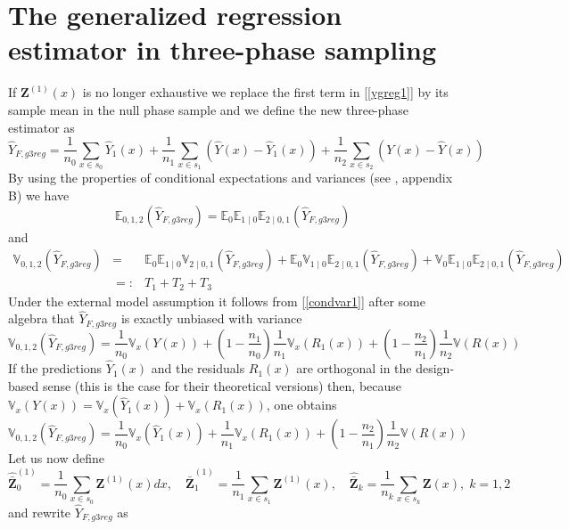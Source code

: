 \documentclass[a4paper,12pt,leqno, titlepage]{article}
\newcommand{\EX}{\mathbb{E}}
\newcommand{\VAR}{\mathbb{V}}
\begin{document}
\section{The generalized regression estimator in three-phase sampling}
If $\pmb{Z}^{(1)}(x)$ is no longer exhaustive we replace the first term in [\ref{ygreg1}] by its sample mean in the null phase sample and we define the new three-phase estimator as
\begin{equation}\label{y0greg1}
\hat{Y}_{F,g3reg} = \frac{1}{n_0} \sum_{x\in{s_0}} \hat{Y}_1(x)
+\frac{1}{n_1}\sum_{x\in{s}_1}(\hat{Y}(x)-\hat{Y}_1(x))
+ \frac{1}{n_2}\sum_{x\in{s}_2}(Y(x)-\hat{Y}(x))
\end{equation}
By using the properties of conditional expectations and variances (see \cite{mandallaz}, appendix B) we have
\begin{equation}\label{condexp1}
\EX_{0,1,2}(\hat{Y}_{F,g3reg})=\EX_0 \EX_{1 \mid 0}\EX_{2 \mid 0,1}(\hat{Y}_{F,g3reg})
\end{equation}
and
\begin{eqnarray}\label{condvar1}
\VAR_{0,1,2}(\hat{Y}_{F,g3reg})&=&\EX_0 \EX_{1 \mid 0}\VAR_{2 \mid 0,1}(\hat{Y}_{F,g3reg})+
\EX_0 \VAR_{1 \mid 0}\EX_{2 \mid 0,1}(\hat{Y}_{F,g3reg})
+\VAR_0 \EX_{1 \mid 0}\EX_{2 \mid 0,1}(\hat{Y}_{F,g3reg})\nonumber \\
&=:& T_1 + T_2 + T_3
\end{eqnarray}
Under the external model assumption it follows from [\ref{condvar1}] after some algebra that $\hat{Y}_{F,g3reg}$ is exactly unbiased with variance
\begin{equation}\label{varexterny0greg}
\VAR_{0,1,2}(\hat{Y}_{F,g3reg})=\frac{1}{n_0}\VAR_{x}(Y(x))+(1-\frac{n_1}{n_0})\frac{1}{n_1}\VAR_x(R_1(x))+
(1-\frac{n_2}{n_1})\frac{1}{n_2}\VAR(R(x))
\end{equation}
If the predictions $\hat{Y}_1(x)$ and the residuals $R_1(x)$ are orthogonal in the design-based sense (this is the case for their theoretical versions) then, because $\VAR_x(Y(x))=\VAR_x(\hat{Y}_1(x))+\VAR_x(R_1(x))$, one obtains
\begin{equation}\label{varexterny0gregbis}
\VAR_{0,1,2}(\hat{Y}_{F,g3reg})=\frac{1}{n_0}\VAR_{x}(\hat{Y}_1(x))+\frac{1}{n_1}\VAR_x(R_1(x))+
(1-\frac{n_2}{n_1})\frac{1}{n_2}\VAR(R(x))
\end{equation}
Let us now define
\begin{equation}\label{meanvalues}
\hat{\bar{\pmb{Z}}}^{(1)}_0=\frac{1}{n_0}\sum_{x\in{s_0}} \pmb{Z}^{(1)}(x)dx ,\quad \hat{\bar{\pmb{Z}}}^{(1)}_1=\frac{1}{n_1}\sum_{x\in{s}_1}\pmb{Z}^{(1)}(x) ,
\quad \hat{\bar{\pmb{Z}}}_k=\frac{1}{n_k}\sum_{x\in{s}_k}\pmb{Z}(x),\;k=1,2
\end{equation}
and rewrite $\hat{Y}_{F,g3reg}$ as
\end{document}
